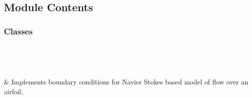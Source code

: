 \documentclass[letterpaper,10pt,english]{sphinxmanual}
\begin{document}
\section{}
\label{\detokenize{autoapi/NS_Airfoil/index:module-NS_Airfoil}}\label{\detokenize{autoapi/NS_Airfoil/index:ns-airfoil}}\label{\detokenize{autoapi/NS_Airfoil/index::doc}}

\subsection{Module Contents}
\label{\detokenize{autoapi/NS_Airfoil/index:module-contents}}

\subsubsection{Classes}
\label{\detokenize{autoapi/NS_Airfoil/index:classes}}

\begin{savenotes}\sphinxatlongtablestart\begin{longtable}[c]{}
\hline

\endfirsthead

%
{}\\
\hline

\endhead

\hline
{}\\
\endfoot

\endlastfoot

\sphinxAtStartPar
{\hyperref[\detokenize{autoapi/NS_Airfoil/index:NS_Airfoil.NS_Airfoil}]{}}
&
\sphinxAtStartPar
Implements boundary conditions for Navier Stokes based model of flow over an airfoil.
\\
\hline
\end{longtable}\sphinxatlongtableend\end{savenotes}
\end{document}
